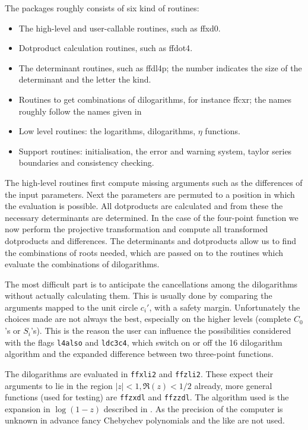 The packages roughly consists of six kind of routines:
\begin{itemize}
\item The high-level and user-callable routines, such as {\comp ffxd0}.
\item Dotproduct calculation routines, such as {\comp ffdot4}.
\item The determinant routines, such as {\comp ffdl4p}; the number indicates 
the size of the determinant and the letter the kind.
\item Routines to get combinations of dilogarithms, for instance {\comp 
ffcxr}; the names roughly follow the names given in \cite{NewAlgorithms}
\item Low level routines: the logarithms, dilogarithms, $\eta$ functions.
\item Support routines: initialisation, the error and warning system, taylor 
series boundaries and consistency checking.
\end{itemize}

The high-level routines first compute missing arguments such as the 
differences of the input parameters.  Next the parameters are permuted to a 
position in which the evaluation is possible.  All dotproducts are calculated 
and from these the necessary determinants are determined.  In the case of the 
four-point function we now perform the projective transformation and 
compute all transformed dotproducts and differences.  The determinants and 
dotproducts allow us to find the combinations of roots needed, which are passed on to the routines which evaluate 
the combinations of dilogarithms.

The most difficult part is to anticipate the cancellations among the 
dilogarithms without actually calculating them.  This is usually done by 
comparing the arguments mapped to the unit circle $c_i'$, with a safety 
margin.  Unfortunately the choices made are not always the best, especially on 
the higher levels (complete $C_0$'s or $S_i$'s).  This is the reason the user 
can influence the possibilities considered with the flags {\tt l4also} and 
{\tt ldc3c4}, which switch on or off the 16 dilogarithm algorithm 
and the expanded difference between two three-point 
functions.

The dilogarithms are evaluated in {\tt ffxli2} and {\tt ffzli2}.  These expect 
their arguments to lie in the region $|z| < 1, \Re(z) <1/2$ already, more 
general functions (used for testing) are {\tt ffzxdl} and {\tt ffzzdl}.  The 
algorithm used is the expansion in $\log(1-z)$ described in 
\cite{tHooft&Veltman}.  As the precision of the computer is unknown in advance 
fancy Chebychev polynomials and the like are not used.

